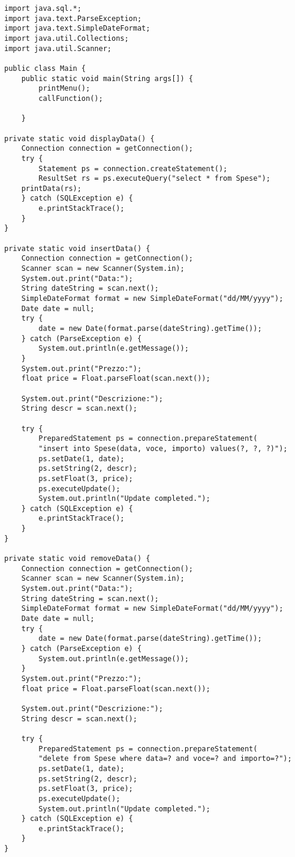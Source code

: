 \documentclass[a4paper, 10pt]{article}
\begin{document}
\begin{lstlisting}
import java.sql.*;
import java.text.ParseException;
import java.text.SimpleDateFormat;
import java.util.Collections;
import java.util.Scanner;

public class Main {
	public static void main(String args[]) {
		printMenu();
		callFunction();

	}

private static void displayData() {
	Connection connection = getConnection();
	try {
		Statement ps = connection.createStatement();
		ResultSet rs = ps.executeQuery("select * from Spese");
	printData(rs);
	} catch (SQLException e) {
		e.printStackTrace();
	}
}

private static void insertData() {
	Connection connection = getConnection();
	Scanner scan = new Scanner(System.in);
	System.out.print("Data:");
	String dateString = scan.next();
	SimpleDateFormat format = new SimpleDateFormat("dd/MM/yyyy");
	Date date = null;
	try {
		date = new Date(format.parse(dateString).getTime());
	} catch (ParseException e) {
		System.out.println(e.getMessage());
	}
	System.out.print("Prezzo:");
	float price = Float.parseFloat(scan.next());
	
	System.out.print("Descrizione:");
	String descr = scan.next();
	
	try {
		PreparedStatement ps = connection.prepareStatement(
		"insert into Spese(data, voce, importo) values(?, ?, ?)");
		ps.setDate(1, date);
		ps.setString(2, descr);
		ps.setFloat(3, price);
		ps.executeUpdate();
		System.out.println("Update completed.");
	} catch (SQLException e) {
		e.printStackTrace();
	}	
}

private static void removeData() {
	Connection connection = getConnection();
	Scanner scan = new Scanner(System.in);
	System.out.print("Data:");
	String dateString = scan.next();
	SimpleDateFormat format = new SimpleDateFormat("dd/MM/yyyy");
	Date date = null;
	try {
		date = new Date(format.parse(dateString).getTime());
	} catch (ParseException e) {
		System.out.println(e.getMessage());
	}
	System.out.print("Prezzo:");
	float price = Float.parseFloat(scan.next());
	
	System.out.print("Descrizione:");
	String descr = scan.next();
	
	try {
		PreparedStatement ps = connection.prepareStatement(
		"delete from Spese where data=? and voce=? and importo=?");
		ps.setDate(1, date);
		ps.setString(2, descr);
		ps.setFloat(3, price);
		ps.executeUpdate();
		System.out.println("Update completed.");
	} catch (SQLException e) {
		e.printStackTrace();
	}
}


\end{lstlisting}
\end{document}
